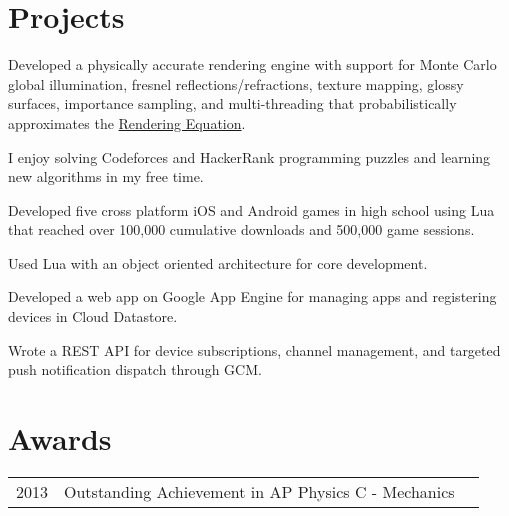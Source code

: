\documentclass[]{resume}
\begin{document}
\begin{minipage}[t]{0.66\textwidth}
\section{Projects}

\begin{tightemize}
\item Developed a physically accurate rendering engine with support for Monte
Carlo global illumination, fresnel reflections/refractions, texture mapping,
glossy surfaces, importance sampling, and multi-threading that
probabilistically approximates the
\href{https://en.wikipedia.org/wiki/Rendering_equation}{Rendering Equation}.
\end{tightemize}
\sectionsep

\begin{tightemize}
\item I enjoy solving Codeforces and HackerRank programming puzzles and
learning new algorithms in my free time.
\end{tightemize}
\sectionsep

\begin{tightemize}
\item Developed five cross platform iOS and Android games in high school using
Lua that reached over 100,000 cumulative downloads and 500,000 game sessions.
\item Used Lua with an object oriented architecture for core development.
\end{tightemize}
\sectionsep

\begin{tightemize}
\item Developed a web app on Google App Engine for managing apps and
registering devices in Cloud Datastore.
\item Wrote a REST API for device subscriptions, channel management, and
targeted push notification dispatch through GCM.
\end{tightemize}
\sectionsep


\section{Awards}
\begin{tabular}{rll}
2013 & Outstanding Achievement in AP Physics C - Mechanics \\
\end{tabular}
\sectionsep

\end{minipage}
\end{document}
